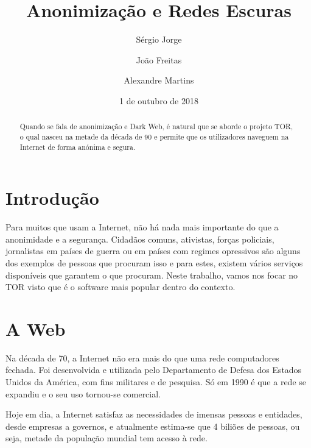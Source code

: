 \documentclass{llncs}
\begin{document}
\mainmatter
\title{Anonimização e Redes Escuras}


\author{Sérgio Jorge \and João Freitas \and Alexandre Martins}



\date{1 de outubro de 2018}


\maketitle
\begin{abstract}
Quando se fala de anonimização e Dark Web, é natural que se aborde o projeto TOR, o qual nasceu na metade da década de 90 e permite que os utilizadores naveguem na Internet de forma anónima e segura.
\end{abstract}

\section{Introdução} 
\hspace{3mm} Para muitos que usam a Internet, não há nada mais importante do que a anonimidade e a segurança. Cidadãos comuns, ativistas, forças policiais, jornalistas em países de guerra ou em países com regimes opressivos são alguns dos exemplos de pessoas que procuram isso e para estes, existem vários serviços disponíveis que garantem o que procuram. Neste trabalho, vamos nos focar no TOR visto que é o software mais popular dentro do contexto.

\section{A Web}

\hspace{3mm} Na década de 70, a Internet não era mais do que uma rede computadores fechada. Foi desenvolvida e utilizada pelo Departamento de Defesa dos Estados Unidos da América, com fins militares e de pesquisa. Só em 1990 é que a rede se expandiu e o seu uso tornou-se comercial.

\par Hoje em dia, a Internet satisfaz as necessidades de imensas pessoas e entidades, desde empresas a governos, e atualmente estima-se que 4 biliões de pessoas, ou seja, metade da população mundial tem acesso à rede.
\end{document}
